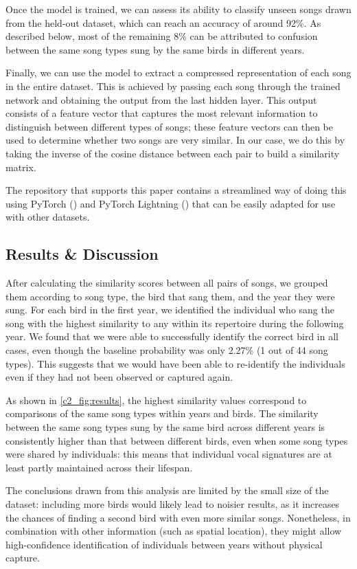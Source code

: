 Once the model is trained, we can assess its ability to classify unseen songs drawn from the held-out dataset, which can reach an accuracy of around 92\%. As described below, most of the remaining 8\% can be attributed to confusion between the same song types sung by the same birds in different years. 

Finally, we can use the model to extract a compressed representation of each song in the entire dataset. This is achieved by passing each song through the trained network and obtaining the output from the last hidden layer. This output consists of a feature vector that captures the most relevant information to distinguish between different types of songs; these feature vectors can then be used to determine whether two songs are very similar. In our case, we do this by taking the inverse of the cosine distance between each pair to build a similarity matrix.

The repository that supports this paper contains a streamlined way of doing this using PyTorch (\citeyear{pytorch2019}) and PyTorch Lightning (\citeyear{pytorchlightning2019}) that can be easily adapted for use with other datasets.


\subsection{Results \& Discussion}

After calculating the similarity scores between all pairs of songs, we grouped them according to song type, the bird that sang them, and the year they were sung. For each bird in the first year, we identified the individual who sang the song with the highest similarity to any within its repertoire during the following year. We found that we were able to successfully identify the correct bird in all cases, even though the baseline probability was only 2.27\% (1 out of 44 song types). This suggests that we would have been able to re-identify the individuals even if they had not been observed or captured again.

As shown in \autoref{c2_fig:results}, the highest similarity values correspond to
comparisons of the same song types within years and birds. The similarity
between the same song types sung by the same bird across different years is
consistently higher than that between different birds, even when some song types were shared by individuals: this means that individual vocal signatures are
at least partly maintained across their lifespan.

The conclusions drawn from this analysis are limited by the small size of the
dataset: including more birds would likely lead to noisier results, as it increases the chances of finding a second bird with even more similar songs. Nonetheless, in
combination with other information (such as spatial location), they might allow
high-confidence identification of individuals between years without physical
capture.

